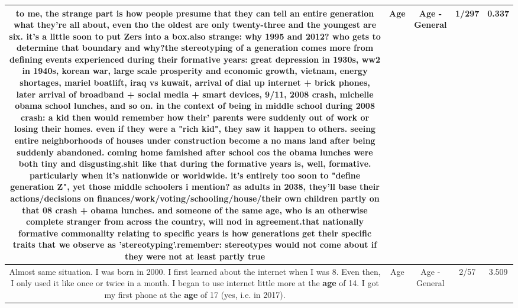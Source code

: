 \documentclass[11pt]{article}
\newlength\mylength
\begin{document}
\begin{center}
\begin{longtable}{|C{.65\mylength}|C{.30\mylength}|C{.12\mylength}|C{.12\mylength}|C{.12\mylength}|}
  \small to me, the strange part is how people presume that they can tell an entire generation what they're all about, even tho the oldest are only twenty-three and the youngest are six.   it's a little soon to put Zers into a box.also strange:  why 1995 and 2012?    who gets to determine that boundary and why?the stereotyping of a generation comes more from defining events experienced during their formative years:  great depression in 1930s,  ww2 in 1940s, korean war, large scale prosperity and economic growth, vietnam, energy shortages, mariel boatlift, iraq vs kuwait, arrival of dial up internet + brick phones, later arrival of broadband + social media + smart devices, 9/11, 2008 crash, michelle obama school lunches, and so on.  in the context of being in middle school during 2008 crash: a kid then would remember how their' parents were suddenly out of work or losing their homes.  even if they were a "rich kid", they saw it happen to others.   seeing entire neighborhoods of houses under construction become a no mans land after being suddenly abandoned.  coming home famished after school cos the obama lunches were both tiny and disgusting.shit like that during the formative years is, well, formative.  particularly when it's nationwide or worldwide.  it's entirely too soon to "define generation Z", yet those middle schoolers  i mention?  as adults in 2038, they'll base their actions/decisions on finances/work/voting/schooling/house/their own children partly on that 08 crash + obama lunches.  and someone of the same \textbf{age}, who is an otherwise complete stranger from across the country, will nod in agreement.that nationally formative commonality relating to specific years is how generations get their specific traits that we observe as 'stereotyping'.remember: stereotypes would not come about if they were not at least partly true\normalsize   & Age & Age - General & 1/297 & 0.337 \\  \hline
  \small Almost same situation. I was born in 2000. I first learned about the internet when I was 8. Even then, I only used it like once or twice in a month. I began to use internet little more at the \textbf{age} of 14. I got my first phone at the \textbf{age} of 17 (yes, i.e. in 2017).\normalsize   & Age & Age - General & 2/57 & 3.509 \\  \hline

\end{longtable}
\end{center}
\end{document}
